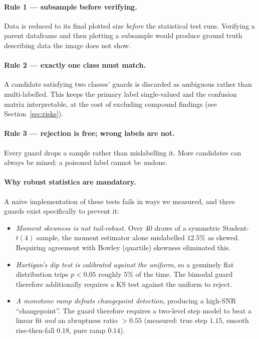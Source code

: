\paragraph{Rule 1 --- subsample before verifying.} Data is reduced to its final
plotted size \emph{before} the statistical test runs. Verifying a parent
dataframe and then plotting a subsample would produce ground truth describing
data the image does not show.

\paragraph{Rule 2 --- exactly one class must match.} A candidate satisfying two
classes' guards is discarded as ambiguous rather than multi-labelled. This keeps
the primary label single-valued and the confusion matrix interpretable, at the
cost of excluding compound findings (see Section~\ref{sec:risks}).

\paragraph{Rule 3 --- rejection is free; wrong labels are not.} Every guard drops
a sample rather than mislabelling it. More candidates can always be mined; a
poisoned label cannot be undone.

\paragraph{Why robust statistics are mandatory.} A naive implementation of these
tests fails in ways we measured, and three guards exist specifically to prevent
it:

\begin{itemize}[leftmargin=1.3em]
  \item \emph{Moment skewness is not tail-robust.} Over 40 draws of a symmetric
  Student-$t(4)$ sample, the moment estimator alone mislabelled $12.5\%$ as
  skewed. Requiring agreement with Bowley (quartile) skewness eliminated this.
  \item \emph{Hartigan's dip test is calibrated against the uniform}, so a
  genuinely flat distribution trips $p<0.05$ roughly $5\%$ of the time. The
  bimodal guard therefore additionally requires a KS test against the uniform to
  reject.
  \item \emph{A monotone ramp defeats changepoint detection}, producing a
  high-SNR ``changepoint''. The guard therefore requires a two-level step model to
  beat a linear fit \emph{and} an abruptness ratio $>0.55$ (measured: true step
  $1.15$, smooth rise-then-fall $0.18$, pure ramp $0.14$).
\end{itemize}

